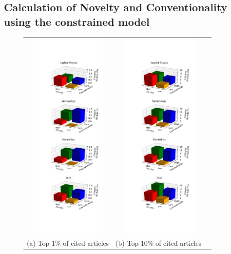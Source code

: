 \documentclass[NETN]{stjour}
\begin{document}
\subsection{Calculation of Novelty and Conventionality using the constrained model}  
\begin{figure}
\centering
\begin{tabular}{ccc}
\includegraphics[width=1.5in]{Fig2H01N10.pdf} & \includegraphics[width=1.5in]{Fig2H10N10.pdf} \\
(a) Top 1\% of cited articles & (b) Top 10\% of cited articles \\
\end{tabular}

\end{figure}
\end{document}
